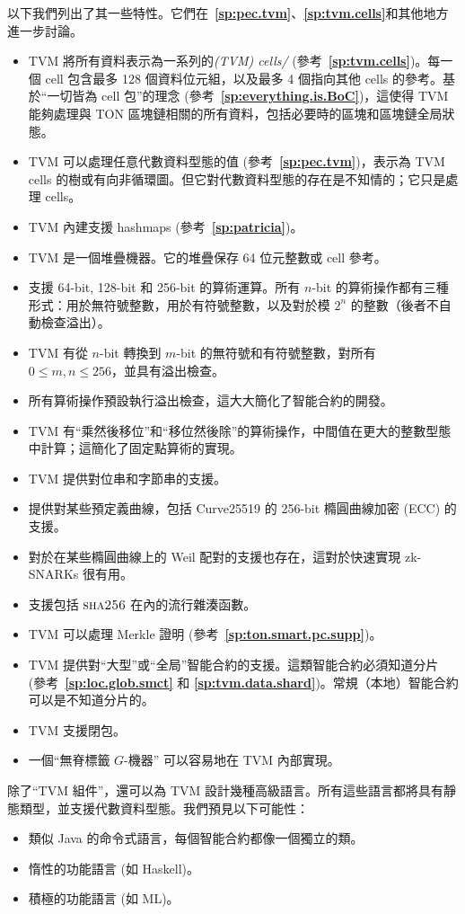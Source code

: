 \documentclass[12pt,oneside]{article}
\def\refpoint#1{{\rm\textbf{\ref{#1}}}}
\let\ptref=\refpoint
\def\opsc#1{\operatorname{\textsc{#1}}}
\def\Sha{\opsc{sha256}}
\begin{document}
以下我們列出了其一些特性。它們在~\ptref{sp:pec.tvm}、\ptref{sp:tvm.cells}和其他地方進一步討論。

\begin{itemize}
\item TVM 將所有資料表示為一系列的{\em (TVM) cells/} (參考~\ptref{sp:tvm.cells})。每一個 cell 包含最多 128 個資料位元組，以及最多 4 個指向其他 cells 的參考。基於“一切皆為 cell 包”的理念 (參考~\ptref{sp:everything.is.BoC})，這使得 TVM 能夠處理與 TON 區塊鏈相關的所有資料，包括必要時的區塊和區塊鏈全局狀態。
\item TVM 可以處理任意代數資料型態的值 (參考~\ptref{sp:pec.tvm})，表示為 TVM cells 的樹或有向非循環圖。但它對代數資料型態的存在是不知情的；它只是處理 cells。
\item TVM 內建支援 hashmaps (參考~\ptref{sp:patricia})。
\item TVM 是一個堆疊機器。它的堆疊保存 64 位元整數或 cell 參考。
\item 支援 64-bit, 128-bit 和 256-bit 的算術運算。所有 $n$-bit 的算術操作都有三種形式：用於無符號整數，用於有符號整數，以及對於模 $2^n$ 的整數（後者不自動檢查溢出）。
\item TVM 有從 $n$-bit 轉換到 $m$-bit 的無符號和有符號整數，對所有 $0\leq m,n\leq 256$，並具有溢出檢查。
\item 所有算術操作預設執行溢出檢查，這大大簡化了智能合約的開發。
\item TVM 有“乘然後移位”和“移位然後除”的算術操作，中間值在更大的整數型態中計算；這簡化了固定點算術的實現。
\item TVM 提供對位串和字節串的支援。
\item 提供對某些預定義曲線，包括 Curve25519 的 256-bit 橢圓曲線加密 (ECC) 的支援。
\item 對於在某些橢圓曲線上的 Weil 配對的支援也存在，這對於快速實現 zk-SNARKs 很有用。
\item 支援包括 $\Sha$ 在內的流行雜湊函數。
\item TVM 可以處理 Merkle 證明 (參考~\ptref{sp:ton.smart.pc.supp})。
\item TVM 提供對“大型”或“全局”智能合約的支援。這類智能合約必須知道分片 (參考~\ptref{sp:loc.glob.smct} 和 \ptref{sp:tvm.data.shard})。常規（本地）智能合約可以是不知道分片的。
\item TVM 支援閉包。
\item 一個“無脊標籤 $G$-機器” \cite{STGM} 可以容易地在 TVM 內部實現。
\end{itemize}
除了“TVM 組件”，還可以為 TVM 設計幾種高級語言。所有這些語言都將具有靜態類型，並支援代數資料型態。我們預見以下可能性：
\begin{itemize}
\item 類似 Java 的命令式語言，每個智能合約都像一個獨立的類。
\item 惰性的功能語言 (如 Haskell)。
\item 積極的功能語言 (如 ML)。
\end{itemize}
 
\end{document}
